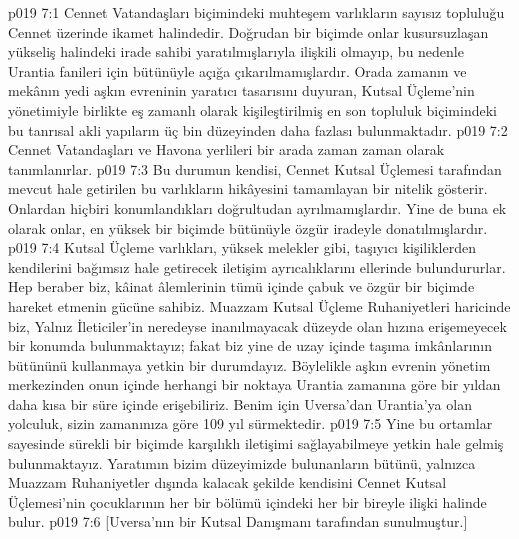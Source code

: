 \vs p019 7:1 Cennet Vatandaşları biçimindeki muhteşem varlıkların sayısız topluluğu Cennet üzerinde ikamet halindedir. Doğrudan bir biçimde onlar kusursuzlaşan yükseliş halindeki irade sahibi yaratılmışlarıyla ilişkili olmayıp, bu nedenle Urantia fanileri için bütünüyle açığa çıkarılmamışlardır. Orada zamanın ve mekânın yedi aşkın evreninin yaratıcı tasarısını duyuran, Kutsal Üçleme’nin yönetimiyle birlikte eş zamanlı olarak kişileştirilmiş en son topluluk biçimindeki bu tanrısal akli yapıların üç bin düzeyinden daha fazlası bulunmaktadır.
\vs p019 7:2 Cennet Vatandaşları ve Havona yerlileri bir arada zaman zaman  olarak tanımlanırlar.
\vs p019 7:3 Bu durumun kendisi, Cennet Kutsal Üçlemesi tarafından mevcut hale getirilen bu varlıkların hikâyesini tamamlayan bir nitelik gösterir. Onlardan hiçbiri konumlandıkları doğrultudan ayrılmamışlardır. Yine de buna ek olarak onlar, en yüksek bir biçimde bütünüyle özgür iradeyle donatılmışlardır.
\vs p019 7:4 Kutsal Üçleme varlıkları, yüksek melekler gibi, taşıyıcı kişiliklerden kendilerini bağımsız hale getirecek iletişim ayrıcalıklarını ellerinde bulundururlar. Hep beraber biz, kâinat âlemlerinin tümü içinde çabuk ve özgür bir biçimde hareket etmenin gücüne sahibiz. Muazzam Kutsal Üçleme Ruhaniyetleri haricinde biz, Yalnız İleticiler’in neredeyse inanılmayacak düzeyde olan hızına erişemeyecek bir konumda bulunmaktayız; fakat biz yine de uzay içinde taşıma imkânlarının bütününü kullanmaya yetkin bir durumdayız. Böylelikle aşkın evrenin yönetim merkezinden onun içinde herhangi bir noktaya Urantia zamanına göre bir yıldan daha kısa bir süre içinde erişebiliriz. Benim için Uversa’dan Urantia’ya olan yolculuk, sizin zamanınıza göre 109 yıl sürmektedir.
\vs p019 7:5 Yine bu ortamlar sayesinde sürekli bir biçimde karşılıklı iletişimi sağlayabilmeye yetkin hale gelmiş bulunmaktayız. Yaratımın bizim düzeyimizde bulunanların bütünü, yalnızca Muazzam Ruhaniyetler dışında kalacak şekilde kendisini Cennet Kutsal Üçlemesi’nin çocuklarının her bir bölümü içindeki her bir bireyle ilişki halinde bulur.
\vs p019 7:6 [Uversa’nın bir Kutsal Danışmanı tarafından sunulmuştur.]
